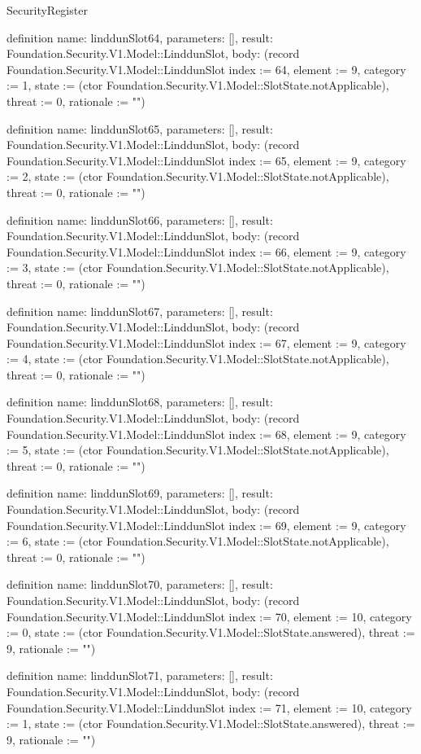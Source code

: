 \begin{lexlean}{SecurityRegister}
\begin{semanticmodule}
definition{
  name: linddunSlot64,
  parameters: [],
  result: Foundation.Security.V1.Model::LinddunSlot,
  body: (record Foundation.Security.V1.Model::LinddunSlot {index := 64, element := 9, category := 1, state := (ctor Foundation.Security.V1.Model::SlotState.notApplicable), threat := 0, rationale := ""})
}

definition{
  name: linddunSlot65,
  parameters: [],
  result: Foundation.Security.V1.Model::LinddunSlot,
  body: (record Foundation.Security.V1.Model::LinddunSlot {index := 65, element := 9, category := 2, state := (ctor Foundation.Security.V1.Model::SlotState.notApplicable), threat := 0, rationale := ""})
}

definition{
  name: linddunSlot66,
  parameters: [],
  result: Foundation.Security.V1.Model::LinddunSlot,
  body: (record Foundation.Security.V1.Model::LinddunSlot {index := 66, element := 9, category := 3, state := (ctor Foundation.Security.V1.Model::SlotState.notApplicable), threat := 0, rationale := ""})
}

definition{
  name: linddunSlot67,
  parameters: [],
  result: Foundation.Security.V1.Model::LinddunSlot,
  body: (record Foundation.Security.V1.Model::LinddunSlot {index := 67, element := 9, category := 4, state := (ctor Foundation.Security.V1.Model::SlotState.notApplicable), threat := 0, rationale := ""})
}

definition{
  name: linddunSlot68,
  parameters: [],
  result: Foundation.Security.V1.Model::LinddunSlot,
  body: (record Foundation.Security.V1.Model::LinddunSlot {index := 68, element := 9, category := 5, state := (ctor Foundation.Security.V1.Model::SlotState.notApplicable), threat := 0, rationale := ""})
}

definition{
  name: linddunSlot69,
  parameters: [],
  result: Foundation.Security.V1.Model::LinddunSlot,
  body: (record Foundation.Security.V1.Model::LinddunSlot {index := 69, element := 9, category := 6, state := (ctor Foundation.Security.V1.Model::SlotState.notApplicable), threat := 0, rationale := ""})
}

definition{
  name: linddunSlot70,
  parameters: [],
  result: Foundation.Security.V1.Model::LinddunSlot,
  body: (record Foundation.Security.V1.Model::LinddunSlot {index := 70, element := 10, category := 0, state := (ctor Foundation.Security.V1.Model::SlotState.answered), threat := 9, rationale := ""})
}

definition{
  name: linddunSlot71,
  parameters: [],
  result: Foundation.Security.V1.Model::LinddunSlot,
  body: (record Foundation.Security.V1.Model::LinddunSlot {index := 71, element := 10, category := 1, state := (ctor Foundation.Security.V1.Model::SlotState.answered), threat := 9, rationale := ""})
}


\end{semanticmodule}
\end{lexlean}
